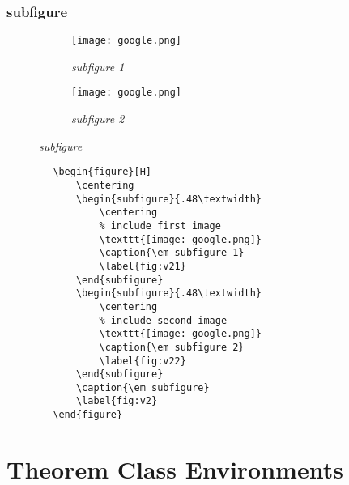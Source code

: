 \documentclass[a4paper, 12pt]{article}
\begin{document}
\subsubsection{subfigure}
\begin{figure}[H]
    \centering
    \begin{subfigure}{.48\textwidth}
        \centering
        \texttt{[image: google.png]}
        \caption{\em subfigure 1}
        \label{fig:v21}
    \end{subfigure}
    \begin{subfigure}{.48\textwidth}
        \centering
        \texttt{[image: google.png]}
        \caption{\em subfigure 2}
        \label{fig:v22}
    \end{subfigure}
    \caption{\em subfigure}
    \label{fig:v2}
\end{figure}

\begin{listing}[ht]
    \begin{verbatim}
        \begin{figure}[H]
            \centering
            \begin{subfigure}{.48\textwidth}
                \centering
                % include first image
                \texttt{[image: google.png]}
                \caption{\em subfigure 1}
                \label{fig:v21}
            \end{subfigure}
            \begin{subfigure}{.48\textwidth}
                \centering
                % include second image
                \texttt{[image: google.png]}
                \caption{\em subfigure 2}
                \label{fig:v22}
            \end{subfigure}
            \caption{\em subfigure}
            \label{fig:v2}
        \end{figure}
    \end{verbatim}
    \caption{\em Subfigure}
    \label{subfigure}
\end{listing}

\clearpage

\section{Theorem Class Environments}
\begin{defn}{}{}
    
\end{defn}
\end{document}
